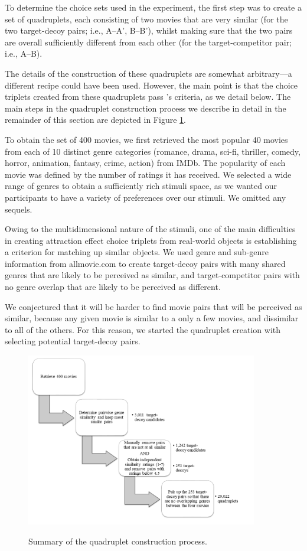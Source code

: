 \documentclass[12pt, a4paper]{article}
\begin{document}
To determine the choice sets used in the experiment, the first step was to create a set of quadruplets, each consisting of two movies that are very similar (for the two target-decoy pairs; i.e., A--A', B--B'), whilst making sure that the two pairs are overall sufficiently different from each other (for the target-competitor pair; i.e., A--B).

The details of the construction of these quadruplets are somewhat arbitrary---a different recipe could have been used. However, the main point is that the choice triplets created from these quadruplets pass \citeauthor{Huber2014}'s \citeyear{Huber2014} criteria, as we detail below. The main steps in the quadruplet construction process we describe in detail in the remainder of this section are depicted in Figure \ref{fig:flow}.


To obtain the set of 400 movies, we first retrieved the most popular 40 movies from each of 10 distinct genre categories (romance, drama, sci-fi, thriller, comedy, horror, animation, fantasy, crime, action) from IMDb. The popularity of each movie was defined by the number of ratings it has received. We selected a wide range of genres to obtain a sufficiently rich stimuli space, as we wanted our participants to have a variety of preferences over our stimuli. We omitted any sequels.

Owing to the multidimensional nature of the stimuli, one of the main difficulties in creating attraction effect choice triplets from real-world objects is establishing a criterion for matching up similar objects. We used genre and sub-genre information from allmovie.com to create target-decoy pairs with many shared genres that are likely to be perceived as similar, and target-competitor pairs with no genre overlap that are likely to be perceived as different.

We conjectured that it will be harder to find movie pairs that will be perceived as similar, because any given movie is similar to a only a few movies, and dissimilar to all of the others. For this reason, we started the quadruplet creation with selecting potential target-decoy pairs.

\begin{figure}[htb!]
\centering
		\caption{Summary of the quadruplet construction process. }
\includegraphics[width=0.9\textwidth]{flow.png}
\label{fig:flow}
\end{figure}
\end{document}
